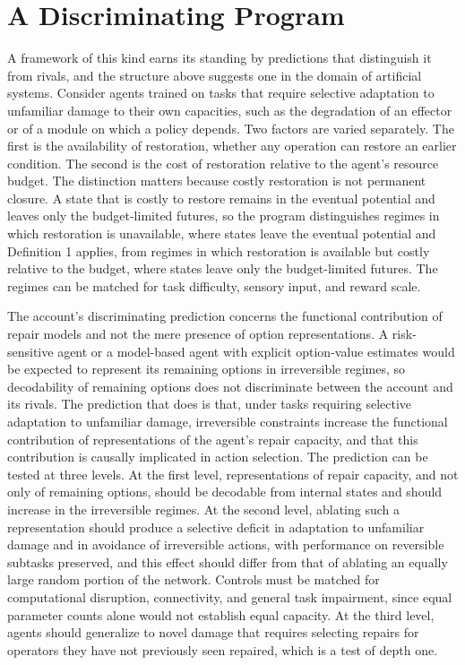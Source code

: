 \documentclass[11pt]{article}
\theoremstyle{definition}
\theoremstyle{plain}
\theoremstyle{remark}
\begin{document}
\section{A Discriminating Program}

A framework of this kind earns its standing by predictions that distinguish it from rivals, and the structure above suggests one in the domain of artificial systems. Consider agents trained on tasks that require selective adaptation to unfamiliar damage to their own capacities, such as the degradation of an effector or of a module on which a policy depends. Two factors are varied separately. The first is the availability of restoration, whether any operation can restore an earlier condition. The second is the cost of restoration relative to the agent's resource budget. The distinction matters because costly restoration is not permanent closure. A state that is costly to restore remains in the eventual potential and leaves only the budget-limited futures, so the program distinguishes regimes in which restoration is unavailable, where states leave the eventual potential and Definition 1 applies, from regimes in which restoration is available but costly relative to the budget, where states leave only the budget-limited futures. The regimes can be matched for task difficulty, sensory input, and reward scale.

The account's discriminating prediction concerns the functional contribution of repair models and not the mere presence of option representations. A risk-sensitive agent or a model-based agent with explicit option-value estimates would be expected to represent its remaining options in irreversible regimes, so decodability of remaining options does not discriminate between the account and its rivals. The prediction that does is that, under tasks requiring selective adaptation to unfamiliar damage, irreversible constraints increase the functional contribution of representations of the agent's repair capacity, and that this contribution is causally implicated in action selection. The prediction can be tested at three levels. At the first level, representations of repair capacity, and not only of remaining options, should be decodable from internal states and should increase in the irreversible regimes. At the second level, ablating such a representation should produce a selective deficit in adaptation to unfamiliar damage and in avoidance of irreversible actions, with performance on reversible subtasks preserved, and this effect should differ from that of ablating an equally large random portion of the network. Controls must be matched for computational disruption, connectivity, and general task impairment, since equal parameter counts alone would not establish equal capacity. At the third level, agents should generalize to novel damage that requires selecting repairs for operators they have not previously seen repaired, which is a test of depth one.
\end{document}
